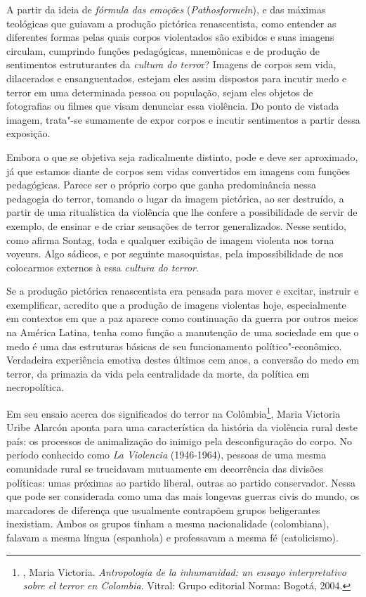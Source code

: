 A partir da ideia de \emph{fórmula das emoções} (\emph{Pathosformeln}),
e das máximas teológicas que guiavam a produção pictórica renascentista,
como entender as diferentes formas pelas quais corpos violentados são
exibidos e suas imagens circulam, cumprindo funções pedagógicas,
mnemônicas e de produção de sentimentos estruturantes da \emph{cultura
do terro}r? Imagens de corpos sem vida, dilacerados e ensanguentados,
estejam eles assim dispostos para incutir medo e terror em uma
determinada pessoa ou população, sejam eles objetos de fotografias ou
filmes que visam denunciar essa violência. Do ponto de vistada imagem,
trata"-se sumamente de expor corpos e incutir sentimentos a partir dessa
exposição.

Embora o que se objetiva seja radicalmente distinto, pode e deve ser
aproximado, já que estamos diante de corpos sem vidas convertidos em
imagens com funções pedagógicas. Parece ser o próprio corpo que ganha
predominância nessa pedagogia do terror, tomando o lugar da imagem
pictórica, ao ser destruído, a partir de uma ritualística da violência
que lhe confere a possibilidade de servir de exemplo, de ensinar e de
criar sensações de terror generalizados. Nesse sentido, como afirma
Sontag, toda e qualquer exibição de imagem violenta nos torna voyeurs.
Algo sádicos, e por seguinte masoquistas, pela impossibilidade de nos
colocarmos externos à essa \emph{cultura do terror}.

Se a produção pictórica renascentista era pensada para mover e excitar,
instruir e exemplificar, acredito que a produção de imagens violentas
hoje, especialmente em contextos em que a paz aparece como continuação
da guerra por outros meios na América Latina, tenha como função a
manutenção de uma sociedade em que o medo é uma das estruturas básicas
de seu funcionamento político"-econômico. Verdadeira experiência emotiva
destes últimos cem anos, a conversão do medo em terror, da primazia da
vida pela centralidade da morte, da política em necropolítica.

\asterisc

Em seu ensaio acerca dos significados do terror na Colômbia\footnote{, Maria Victoria. \emph{Antropologia de la inhumanidad: un
  ensayo interpretativo sobre el terror en Colombia}. Vitral: Grupo
  editorial Norma: Bogotá, 2004.}, Maria Victoria Uribe Alarcón aponta
para uma característica da história da violência rural deste país: os
processos de animalização do inimigo pela desconfiguração do corpo. No
período conhecido como \emph{La Violencia} (1946-1964), pessoas de uma
mesma comunidade rural se trucidavam mutuamente em decorrência das
divisões políticas: umas próximas ao partido liberal, outras ao partido
conservador. Nessa que pode ser considerada como uma das mais longevas
guerras civis do mundo, os marcadores de diferença que usualmente
contrapõem grupos beligerantes inexistiam. Ambos os grupos tinham a
mesma nacionalidade (colombiana), falavam a mesma língua (espanhola) e
professavam a mesma fé (catolicismo).

